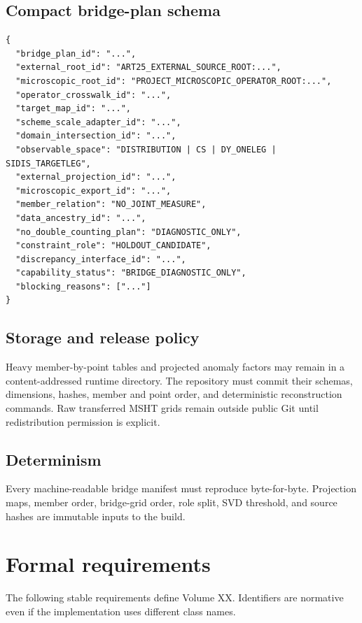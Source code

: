 \documentclass[11pt]{article}
\begin{document}
\subsection{Compact bridge-plan schema}

\begin{verbatim}
{
  "bridge_plan_id": "...",
  "external_root_id": "ART25_EXTERNAL_SOURCE_ROOT:...",
  "microscopic_root_id": "PROJECT_MICROSCOPIC_OPERATOR_ROOT:...",
  "operator_crosswalk_id": "...",
  "target_map_id": "...",
  "scheme_scale_adapter_id": "...",
  "domain_intersection_id": "...",
  "observable_space": "DISTRIBUTION | CS | DY_ONELEG | SIDIS_TARGETLEG",
  "external_projection_id": "...",
  "microscopic_export_id": "...",
  "member_relation": "NO_JOINT_MEASURE",
  "data_ancestry_id": "...",
  "no_double_counting_plan": "DIAGNOSTIC_ONLY",
  "constraint_role": "HOLDOUT_CANDIDATE",
  "discrepancy_interface_id": "...",
  "capability_status": "BRIDGE_DIAGNOSTIC_ONLY",
  "blocking_reasons": ["..."]
}
\end{verbatim}

\subsection{Storage and release policy}

Heavy member-by-point tables and projected anomaly factors may remain in a content-addressed runtime directory.  The repository must commit their schemas, dimensions, hashes, member and point order, and deterministic reconstruction commands.  Raw transferred MSHT grids remain outside public Git until redistribution permission is explicit.

\subsection{Determinism}

Every machine-readable bridge manifest must reproduce byte-for-byte.  Projection maps, member order, bridge-grid order, role split, SVD threshold, and source hashes are immutable inputs to the build.

\section{Formal requirements}
\label{sec:requirements}

The following stable requirements define Volume XX.  Identifiers are normative even if the implementation uses different class names.
\end{document}
